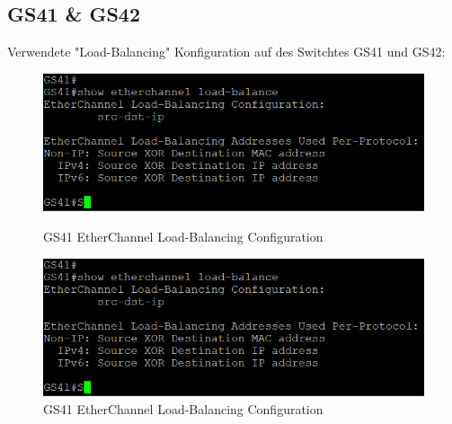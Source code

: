 \documentclass{article}
\begin{document}
\subsection{GS41 \& GS42}
Verwendete "Load-Balancing" Konfiguration auf des Switchtes GS41 und GS42:\\
\begin{figure}[!htp]
  \centering
  \begin{minipage}[b]{0.45\textwidth}
    \includegraphics[width=\textwidth]{Arbeitsergebnisse/GS41/GS41_etherchannel.png}
    \caption{GS41 EtherChannel Load-Balancing Configuration}
  \end{minipage}
  \hspace{0.8cm}
  \begin{minipage}[b]{0.45\textwidth}
    \includegraphics[width=\textwidth]{Arbeitsergebnisse/GS41/GS41_etherchannel.png}
    \caption{GS41 EtherChannel Load-Balancing Configuration}
  \end{minipage}
\end{figure}

\pagebreak
\end{document}

